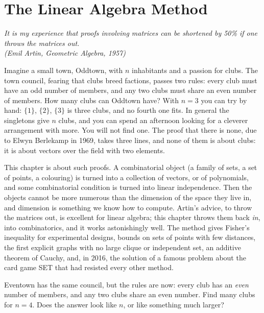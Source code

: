 \chapter{The Linear Algebra Method}

\begin{center}\itshape
It is my experience that proofs involving matrices can be shortened by 50\% if one throws the matrices out.\\
\upshape(Emil Artin, \emph{Geometric Algebra}, 1957)
\end{center}

Imagine a small town, Oddtown, with $n$ inhabitants and a passion for clubs. The town council, fearing that clubs breed
factions, passes two rules: every club must have an odd number of members, and any two clubs must share an even number of
members. How many clubs can Oddtown have? With $n=3$ you can try by hand: $\{1\}$, $\{2\}$, $\{3\}$ is three clubs, and no fourth one
fits. In general the singletons give $n$ clubs, and you can spend an afternoon looking for a cleverer arrangement with more.
You will not find one. The proof that there is none, due to Elwyn Berlekamp in 1969, takes three lines, and none of them
is about clubs: it is about vectors over the field with two elements.

This chapter is about such proofs. A combinatorial object (a family of sets, a set of points, a colouring) is turned into a
collection of vectors, or of polynomials, and some combinatorial condition is turned into linear independence. Then the
objects cannot be more numerous than the dimension of the space they live in, and dimension is something we know how
to compute. Artin's advice, to throw the matrices out, is excellent for linear algebra; this chapter throws them back
\emph{in}, into combinatorics, and it works astonishingly well. The method gives Fisher's inequality for experimental designs,
bounds on sets of points with few distances, the first explicit graphs with no large clique or independent set, an additive
theorem of Cauchy, and, in 2016, the solution of a famous problem about the card game SET that had resisted every other method.

\begin{think}
Eventown has the same council, but the rules are now: every club has an \emph{even} number of members, and any two clubs share an
even number. Find many clubs for $n=4$. Does the answer look like $n$, or like something much larger?
\end{think}

